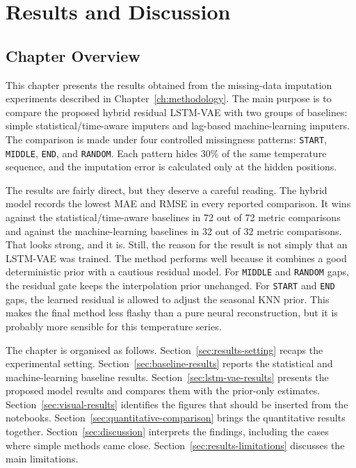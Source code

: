
\chapter{Results and Discussion}
\label{ch:results-discussion}

\section{Chapter Overview}

This chapter presents the results obtained from the missing-data imputation experiments described in Chapter~\ref{ch:methodology}. The main purpose is to compare the proposed hybrid residual LSTM-VAE with two groups of baselines: simple statistical/time-aware imputers and lag-based machine-learning imputers. The comparison is made under four controlled missingness patterns: \texttt{START}, \texttt{MIDDLE}, \texttt{END}, and \texttt{RANDOM}. Each pattern hides 30\% of the same temperature sequence, and the imputation error is calculated only at the hidden positions.

The results are fairly direct, but they deserve a careful reading. The hybrid model records the lowest MAE and RMSE in every reported comparison. It wins against the statistical/time-aware baselines in 72 out of 72 metric comparisons and against the machine-learning baselines in 32 out of 32 metric comparisons. That looks strong, and it is. Still, the reason for the result is not simply that an LSTM-VAE was trained. The method performs well because it combines a good deterministic prior with a cautious residual model. For \texttt{MIDDLE} and \texttt{RANDOM} gaps, the residual gate keeps the interpolation prior unchanged. For \texttt{START} and \texttt{END} gaps, the learned residual is allowed to adjust the seasonal KNN prior. This makes the final method less flashy than a pure neural reconstruction, but it is probably more sensible for this temperature series.

The chapter is organised as follows. Section~\ref{sec:results-setting} recaps the experimental setting. Section~\ref{sec:baseline-results} reports the statistical and machine-learning baseline results. Section~\ref{sec:lstm-vae-results} presents the proposed model results and compares them with the prior-only estimates. Section~\ref{sec:visual-results} identifies the figures that should be inserted from the notebooks. Section~\ref{sec:quantitative-comparison} brings the quantitative results together. Section~\ref{sec:discussion} interprets the findings, including the cases where simple methods came close. Section~\ref{sec:results-limitations} discusses the main limitations.

